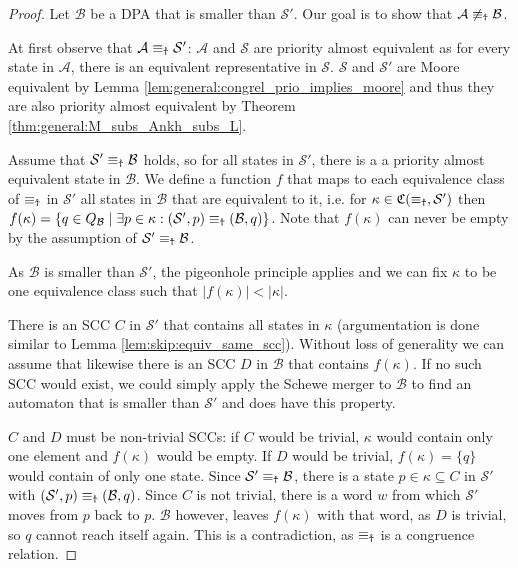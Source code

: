 \begin{proof}
	Let $\mathcal{B}$ be a DPA that is smaller than $\mathcal{S}'$. Our goal is to show that $\mathcal{A} \not\equiv_\text{\Ankh} \mathcal{B}$.
	
	At first observe that $\mathcal{A} \equiv_\text{\Ankh} \mathcal{S}'$: $\mathcal{A}$ and $\mathcal{S}$ are priority almost equivalent as for every state in $\mathcal{A}$, there is an equivalent representative in $\mathcal{S}$. $\mathcal{S}$ and $\mathcal{S}'$ are Moore equivalent by Lemma \ref{lem:general:congrel_prio_implies_moore} and thus they are also priority almost equivalent by Theorem \ref{thm:general:M_subs_Ankh_subs_L}.

	Assume that $\mathcal{S}' \equiv_\text{\Ankh} \mathcal{B}$ holds, so for all states in $\mathcal{S}'$, there is a a priority almost equivalent state in $\mathcal{B}$. We define a function $f$ that maps to each equivalence class of $\equiv_\text{\Ankh}$ in $\mathcal{S}'$ all states in $\mathcal{B}$ that are equivalent to it, i.e. for $\kappa \in \mathfrak{C}(\equiv_\text{\Ankh}, \mathcal{S'})$ then $f(\kappa) = \{q \in Q_\mathcal{B} \mid \exists p \in \kappa: (\mathcal{S}', p) \equiv_\text{\Ankh} (\mathcal{B}, q) \}$. Note that $f(\kappa)$ can never be empty by the assumption of $\mathcal{S}' \equiv_\text{\Ankh} \mathcal{B}$.
	
	As $\mathcal{B}$ is smaller than $\mathcal{S}'$, the pigeonhole principle applies and we can fix $\kappa$ to be one equivalence class such that $|f(\kappa)| < |\kappa|$.
	
	There is an SCC $C$ in $\mathcal{S}'$ that contains all states in $\kappa$ (argumentation is done similar to Lemma \ref{lem:skip:equiv_same_scc}). Without loss of generality we can assume that likewise there is an SCC $D$ in $\mathcal{B}$ that contains $f(\kappa)$. If no such SCC would exist, we could simply apply the Schewe merger to $\mathcal{B}$ to find an automaton that is smaller than $\mathcal{S}'$ and does have this property.
	
	$C$ and $D$ must be non-trivial SCCs: if $C$ would be trivial, $\kappa$ would contain only one element and $f(\kappa)$ would be empty. If $D$ would be trivial, $f(\kappa) = \{q\}$ would contain of only one state. Since $\mathcal{S}' \equiv_\text{\Ankh} \mathcal{B}$, there is a state $p \in \kappa \subseteq C$ in $\mathcal{S}'$ with $(\mathcal{S}', p) \equiv_\text{\Ankh} (\mathcal{B}, q)$. Since $C$ is not trivial, there is a word $w$ from which $\mathcal{S}'$ moves from $p$ back to $p$. $\mathcal{B}$ however, leaves $f(\kappa)$ with that word, as $D$ is trivial, so $q$ cannot reach itself again. This is a contradiction, as $\equiv_\text{\Ankh}$ is a congruence relation.
	

\end{proof}
